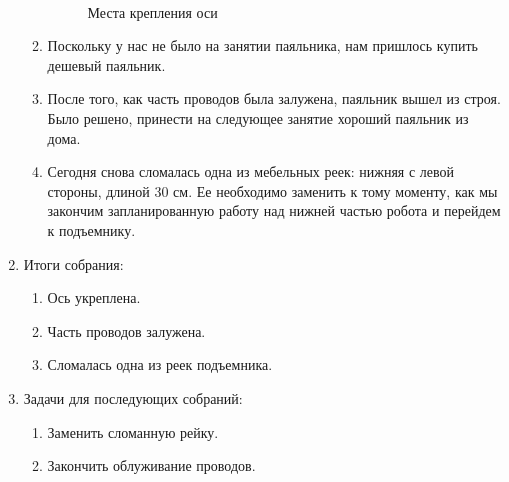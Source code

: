 \begin{enumerate}
\begin{enumerate}
\begin{figure}[H]
\begin{minipage}[h]{0.29\linewidth}
			\end{minipage}
			\hfill
			\begin{minipage}[h]{0.2\linewidth}
				\center  
			\end{minipage}
			\caption{Места крепления оси}
		\end{figure}
		
		\item Поскольку у нас не было на занятии паяльника, нам пришлось купить дешевый паяльник.
		
        \item После того, как часть проводов была залужена, паяльник вышел из строя. Было решено, принести на следующее занятие хороший паяльник из дома.
        
        \item Сегодня снова сломалась одна из мебельных реек: нижняя с левой стороны, длиной 30 см. Ее необходимо заменить к тому моменту, как мы закончим запланированную работу над нижней частью робота и перейдем к подъемнику.

	\end{enumerate}
	
	\item Итоги собрания:
	\begin{enumerate}
		
		\item Ось укреплена.
		
		\item Часть проводов залужена.
		
		\item Сломалась одна из реек подъемника.
		
	\end{enumerate}
	
	\item Задачи для последующих собраний:
	\begin{enumerate}
		
		\item Заменить сломанную рейку.
		
		\item Закончить облуживание проводов.
			
	\end{enumerate}
\end{enumerate}
\fillpage
